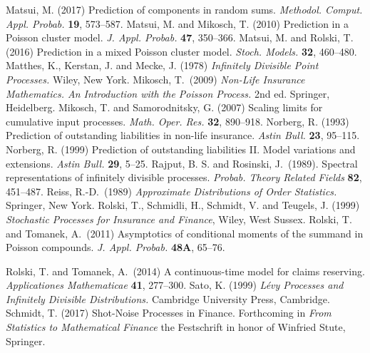 \documentclass[11pt,leqno%
]{amsart}
\newcommand{\1}{{\mathbf 1}}
\begin{document}
\begin{thebibliography}{99}
{\sc Matsui, M.} (2017)
Prediction of components in random sums. 
{\em Methodol. Comput. Appl. Probab.} {\bf 19}, 573--587. 
{\sc Matsui, M. and Mikosch, T.} (2010)
Prediction in a Poisson cluster model. {\em J. Appl. Probab.} {\bf 47}, 350--366. 
{\sc Matsui, M. and Rolski, T.} (2016) 
Prediction in a mixed Poisson cluster model.
{\em Stoch. Models.} {\bf 32}, 460--480.
{\sc Matthes, K., Kerstan, J. and Mecke, J.} (1978)
{\em Infinitely Divisible Point Processes.} Wiley, New York.
{\sc Mikosch, T.}\ (2009)
{\em Non-Life Insurance Mathematics. An Introduction with the 
Poisson Process.} 2nd ed. Springer, Heidelberg.
{\sc Mikosch, T. and Samorodnitsky, G.} (2007) 
Scaling limits for cumulative input processes.  {\em Math. Oper. Res.}
{\bf 32}, 890--918. 
{\sc Norberg, R.} (1993)
Prediction of outstanding liabilities in non-life insurance. {\em Astin
	Bull.} {\bf 23}, 95--115.
{\sc Norberg, R.} (1999)
Prediction of outstanding liabilities II. Model variations and
	extensions. {\em Astin
	Bull.} {\bf 29}, 5--25.
{\sc Rajput, B. S. and Rosinski, J.}\ (1989). 
Spectral representations of infinitely divisible processes. 
{\em Probab. Theory Related Fields} {\bf 82}, 451--487.
{\sc Reiss, R.-D.}\ (1989)
{\em Approximate Distributions of Order Statistics.} Springer, New York.
{\sc Rolski, T., Schmidli, H., Schmidt, V. and Teugels, J.} (1999)
{\it Stochastic Processes for Insurance and Finance}, Wiley, West
	Sussex.
{\sc Rolski, T. and Tomanek, A.}\ (2011)
Asymptotics of conditional moments of the summand in Poisson compounds. 
{\em J. Appl. Probab.} {\bf 48A}, 65--76. 

{\sc Rolski, T. and Tomanek, A.}\ (2014)
A continuous-time model for claims reserving. 
{\em Applicationes Mathematicae} {\bf 41}, 277--300.
{\sc Sato, K.} (1999) 
{\em L\'evy Processes and Infinitely Divisible Distributions.} 
Cambridge University Press, Cambridge.
{\sc Schmidt, T.} (2017) 
Shot-Noise Processes in Finance. Forthcoming in {\em From Statistics to Mathematical Finance} the Festschrift in honor of Winfried Stute, Springer.
\end{thebibliography}
\end{document}
